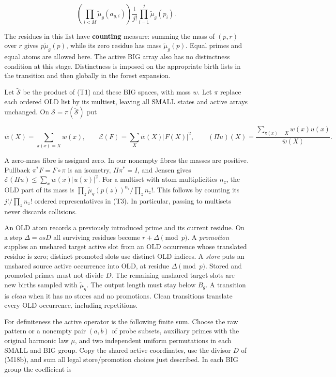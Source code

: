 \[
\left(\prod_{i<M}\widetilde\mu_g(a_{g,i})\right)
 \frac1{j!}\prod_{i=1}^j\widetilde\mu_g(p_i).
\tag{T3}
\]

The residues in this list have \textbf{counting} measure: summing the
mass of \((p,r)\) over \(r\) gives \(p\widetilde\mu_g(p)\), while its
zero residue has mass \(\widetilde\mu_g(p)\). Equal primes and equal
atoms are allowed here. The active BIG array also has no distinctness
condition at this stage. Distinctness is imposed on the appropriate
birth lists in the transition and then globally in the forest expansion.

Let \(\widetilde{\mathscr S}\) be the product of (T1) and these BIG
spaces, with mass \(w\). Let \(\pi\) replace each ordered OLD list by
its multiset, leaving all SMALL states and active arrays unchanged. On
\(\mathscr S=\pi(\widetilde{\mathscr S})\) put

\[
\bar w(X)=\sum_{\pi(x)=X}w(x),\qquad
\mathcal E(F)=\sum_X\bar w(X)|F(X)|^2,
\qquad
(\Pi u)(X)=\frac{\sum_{\pi(x)=X}w(x)u(x)}{\bar w(X)}.
\tag{T4}
\]

A zero-mass fibre is assigned zero. In our nonempty fibres the masses
are positive. Pullback \(\pi^*F=F\circ\pi\) is an isometry,
\(\Pi\pi^*=I\), and Jensen gives
\(\mathcal E(\Pi u)\le\sum_xw(x)|u(x)|^2\). For a multiset with atom
multiplicities \(n_z\), the OLD part of its mass is
\(\prod_z\widetilde\mu_g(p(z))^{n_z}/\prod_z n_z!\). This follows by
counting its \(j!/\prod_z n_z!\) ordered representatives in (T3). In
particular, passing to multisets never discards collisions.

An OLD atom records a previously introduced prime and its current
residue. On a step \(\Delta=o sD\) all surviving residues become
\(r+\Delta\pmod p\). A \emph{promotion} supplies an unshared target
active slot from an OLD occurrence whose translated residue is zero;
distinct promoted slots use distinct OLD indices. A \emph{store} puts an
unshared source active occurrence into OLD, at residue
\(\Delta\pmod p\). Stored and promoted primes must not divide \(D\). The
remaining unshared target slots are new births sampled with
\(\widetilde\mu_g\). The output length must stay below \(B_g\). A
transition is \emph{clean} when it has no stores and no promotions.
Clean transitions translate every OLD occurrence, including repetitions.

For definiteness the active operator is the following finite sum. Choose
the raw pattern or a nonempty pair \((a,b)\) of probe subsets, auxiliary
primes with the original harmonic law \(\mu\), and two independent
uniform permutations in each SMALL and BIG group. Copy the shared active
coordinates, use the divisor \(D\) of (M18b), and sum all legal
store/promotion choices just described. In each BIG group the
coefficient is

